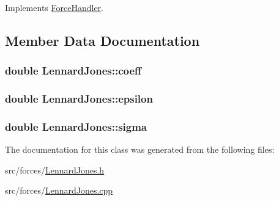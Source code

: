 Implements \hyperlink{classForceHandler_a8aba17d6565f6082c3e088d0abc46e0e}{Force\+Handler}.



\subsection{Member Data Documentation}
\hypertarget{classLennardJones_a23c80acc9a392671175565025e03b2e2}{
\subsubsection[{coeff}]{\setlength{\rightskip}{0pt plus 5cm}double Lennard\+Jones\+::coeff\hspace{0.3cm}{\ttfamily [private]}}}\label{classLennardJones_a23c80acc9a392671175565025e03b2e2}
\hypertarget{classLennardJones_aff900d31ba58d734ed32b03e004dcf03}{
\subsubsection[{epsilon}]{\setlength{\rightskip}{0pt plus 5cm}double Lennard\+Jones\+::epsilon\hspace{0.3cm}{\ttfamily [private]}}}\label{classLennardJones_aff900d31ba58d734ed32b03e004dcf03}
\hypertarget{classLennardJones_a2101a01b7e63f01fab2c535bcfe08a74}{
\subsubsection[{sigma}]{\setlength{\rightskip}{0pt plus 5cm}double Lennard\+Jones\+::sigma\hspace{0.3cm}{\ttfamily [private]}}}\label{classLennardJones_a2101a01b7e63f01fab2c535bcfe08a74}


The documentation for this class was generated from the following files\+:\begin{DoxyCompactItemize}
\item 
src/forces/\hyperlink{LennardJones_8h}{Lennard\+Jones.\+h}\item 
src/forces/\hyperlink{LennardJones_8cpp}{Lennard\+Jones.\+cpp}\end{DoxyCompactItemize}
